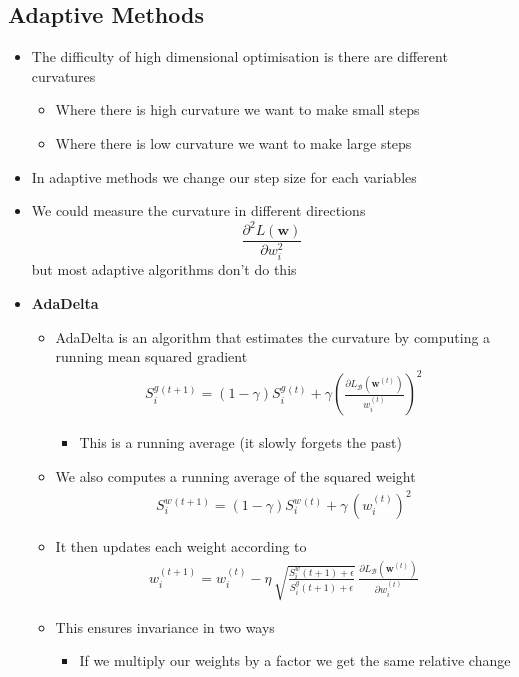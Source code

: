 \documentclass[11pt]{article}
\begin{document}
\subsection{Adaptive Methods}
\label{sec:orgea5761d}
\begin{itemize}
\item The difficulty of high dimensional optimisation is there are different curvatures
\begin{itemize}
\item Where there is high curvature we want to make small steps
\item Where there is low curvature we want to make large steps
\end{itemize}
\item In adaptive methods we change our step size for each variables
\item We could measure the curvature in different directions
$$ \frac{\partial^2 L(\bm{w})}{\partial w_i^2} $$
but most adaptive algorithms don't do this
\item \textbf{AdaDelta}
\begin{itemize}
\item AdaDelta is an algorithm  that estimates the curvature by computing
a running mean squared gradient
\begin{align*}
   S^g_i^{(t+1)} = (1-\gamma) S^g_i^{(t)} + \gamma \left(
   \frac{\partial L_{\mathcal{B}}(\bm{w}^{(t)})}{w_i^{(t)}} \right)^2
\end{align*}
\begin{itemize}
\item This is a running average (it slowly forgets the past)
\end{itemize}
\item We also computes a running average of the squared weight
\begin{align*}
  S^w_i^{(t+1)} = (1-\gamma) S^w_i^{(t)} + \gamma  \, (w_i^{(t)})^2
\end{align*}
\item It then updates each weight according to
\begin{align*}
  w_i^{(t+1)} = w_i^{(t)} - \eta \,
  \sqrt{\frac{S^w_i(t+1)+\epsilon}{S^g_i(t+1)+\epsilon}}\,
  \frac{\partial L_{\mathcal{B}}(\bm{w}^{(t)})}{\partial w_i^{(t)}}
\end{align*}
\item This ensures invariance in two ways
\begin{itemize}
\item If we multiply our weights by a factor we get the same relative change

\end{itemize}
\end{itemize}
\end{itemize}
\end{document}
